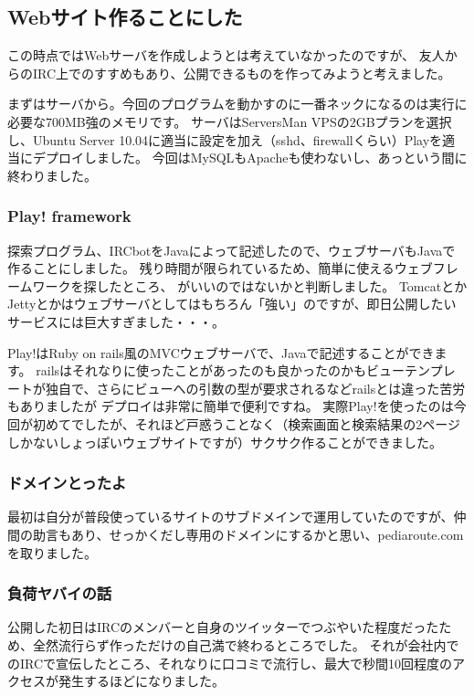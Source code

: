 \documentclass[b5paper]{jsarticle}
\begin{document}
\subsection{Webサイト作ることにした}
この時点ではWebサーバを作成しようとは考えていなかったのですが、
友人からのIRC上でのすすめもあり、公開できるものを作ってみようと考えました。

まずはサーバから。今回のプログラムを動かすのに一番ネックになるのは実行に必要な700MB強のメモリです。
サーバはServersMan VPSの2GBプランを選択し、Ubuntu Server 10.04に適当に設定を加え（sshd、firewallくらい）Playを適当にデプロイしました。
今回はMySQLもApacheも使わないし、あっという間に終わりました。

\subsubsection{Play! framework}
探索プログラム、IRCbotをJavaによって記述したので、ウェブサーバもJavaで作ることにしました。
残り時間が限られているため、簡単に使えるウェブフレームワークを探したところ、
がいいのではないかと判断しました。
TomcatとかJettyとかはウェブサーバとしてはもちろん「強い」のですが、即日公開したいサービスには巨大すぎました・・・。

Play!はRuby on rails風のMVCウェブサーバで、Javaで記述することができます。
railsはそれなりに使ったことがあったのも良かったのかもビューテンプレートが独自で、さらにビューへの引数の型が要求されるなどrailsとは違った苦労もありましたが
デプロイは非常に簡単で便利ですね。
実際Play!を使ったのは今回が初めてでしたが、それほど戸惑うことなく（検索画面と検索結果の2ページしかないしょっぽいウェブサイトですが）サクサク作ることができました。

\subsubsection{ドメインとったよ}
最初は自分が普段使っているサイトのサブドメインで運用していたのですが、仲間の助言もあり、せっかくだし専用のドメインにするかと思い、pediaroute.comを取りました。

\subsubsection{負荷ヤバイの話}
公開した初日はIRCのメンバーと自身のツイッターでつぶやいた程度だったため、全然流行らず作っただけの自己満で終わるところでした。
それが会社内でのIRCで宣伝したところ、それなりに口コミで流行し、最大で秒間10回程度のアクセスが発生するほどになりました。
\end{document}
